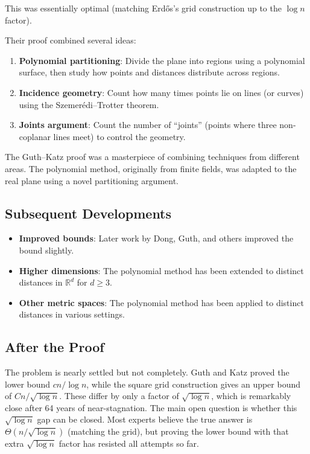 This was essentially optimal (matching Erd\H{o}s's grid construction up to the $\log n$ factor).

Their proof combined several ideas:

\begin{enumerate}
\item \textbf{Polynomial partitioning}: Divide the plane into regions using a polynomial surface, then study how points and distances distribute across regions.
\item \textbf{Incidence geometry}: Count how many times points lie on lines (or curves) using the Szemer\'edi--Trotter theorem.
\item \textbf{Joints argument}: Count the number of ``joints'' (points where three non-coplanar lines meet) to control the geometry.
\end{enumerate}

\begin{highlightbox}
The Guth--Katz proof was a masterpiece of combining techniques from different areas. The polynomial method, originally from finite fields, was adapted to the real plane using a novel partitioning argument.
\end{highlightbox}

\subsection{Subsequent Developments}

\begin{itemize}
\item \textbf{Improved bounds}: Later work by Dong, Guth, and others improved the bound slightly.
\item \textbf{Higher dimensions}: The polynomial method has been extended to distinct distances in $\mathbb{R}^d$ for $d \geq 3$.
\item \textbf{Other metric spaces}: The polynomial method has been applied to distinct distances in various settings.
\end{itemize}

\subsection{After the Proof}

The problem is nearly settled but not completely. Guth and Katz proved the lower bound $cn / \log n$, while the square grid construction gives an upper bound of $Cn / \sqrt{\log n}$. These differ by only a factor of $\sqrt{\log n}$, which is remarkably close after 64 years of near-stagnation. The main open question is whether this $\sqrt{\log n}$ gap can be closed. Most experts believe the true answer is $\Theta(n / \sqrt{\log n})$ (matching the grid), but proving the lower bound with that extra $\sqrt{\log n}$ factor has resisted all attempts so far.

